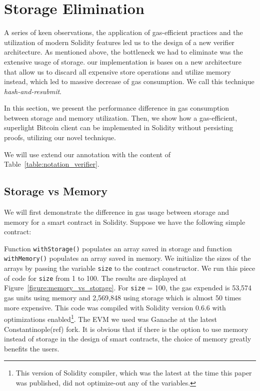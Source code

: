 

\section{Storage Elimination}

A series of keen observations, the application of gas-efficient practices and
the utilization of modern Solidity features led us to the design of a new
verifier architecture. As mentioned above, the bottleneck we had to eliminate
was the extensive usage of storage. our implementation is bases on a new
architecture that allow us to discard all expensive store operations and
utilize memory instead, which led to massive decrease of gas consumption. We
call this technique \emph{hash-and-resubmit}.

In this section, we present the performance difference in gas consumption
between storage and memory utilization. Then, we show how a gas-efficient,
superlight Bitcoin client can be implemented in Solidity without persisting
proofs, utilizing our novel technique.

We will use extend our annotation with the content of
Table~\ref{table:notation_verifier}.



\subsection{Storage vs Memory}

We will first demonstrate the difference in gas usage between storage and
memory for a smart contract in Solidity. Suppose we have the following simple
contract:



Function \texttt{withStorage()} populates an array saved in storage and
function \texttt{withMemory()} populates an array saved in memory. We
initialize the sizes of the arrays by passing the variable \texttt{size} to the
contract constructor. We run this piece of code for \texttt{size} from 1 to
100. The results are displayed at Figure~\ref{figure:memory_vs_storage}. For
\texttt{size} = 100, the gas expended is 53,574 gas units using memory and
2,569,848 using storage which is almost 50 times more expensive. This code was
compiled with Solidity version 0.6.6 with optimizations enabled\footnote{This
version of Solidity compiler, which was the latest at the time this paper was
published, did not optimize-out any of the variables.}. The EVM we used  was
Ganache at the latest Constantinople(ref) fork. It is obvious that if there is
the option to use memory instead of storage in the design of smart contracts,
the choice of memory greatly benefits the users.

